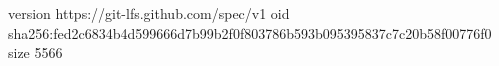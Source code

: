 version https://git-lfs.github.com/spec/v1
oid sha256:fed2c6834b4d599666d7b99b2f0f803786b593b095395837c7c20b58f00776f0
size 5566
